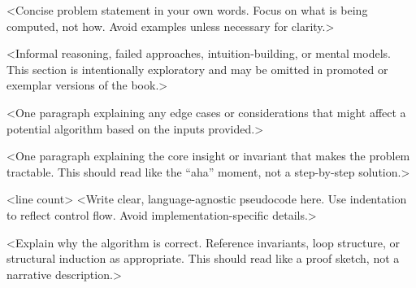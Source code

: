 %


\label{prob:<domain>-<short-name>}

\ProblemSummary
<Concise problem statement in your own words. Focus on what is being computed,
not how. Avoid examples unless necessary for clarity.>

\begin{Thinking}
<Informal reasoning, failed approaches, intuition-building, or mental models.
This section is intentionally exploratory and may be omitted in promoted or
exemplar versions of the book.>
\end{Thinking}

\EdgeCases
<One paragraph explaining any edge cases or considerations that might affect a potential algorithm based on the inputs provided.>

\KeyIdea
<One paragraph explaining the core insight or invariant that makes the problem
tractable. This should read like the “aha” moment, not a step-by-step solution.>

\Algorithm
\begin{CodeBlock}[style=pseudo,caption={Pseudocode}]{<line count>}
<Write clear, language-agnostic pseudocode here.
Use indentation to reflect control flow.
Avoid implementation-specific details.>
\end{CodeBlock}

\Correctness
<Explain why the algorithm is correct.
Reference invariants, loop structure, or structural induction as appropriate.
This should read like a proof sketch, not a narrative description.>

